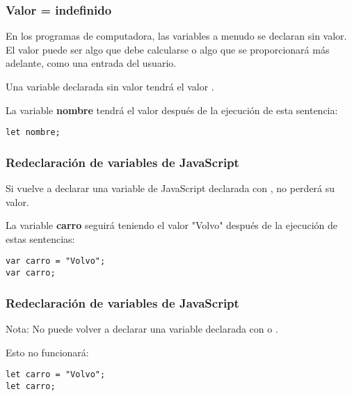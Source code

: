 \begin{frame}[fragile]
  \frametitle{Valor = indefinido}

  En los programas de computadora, las variables a menudo se declaran
  sin valor. El valor puede ser algo que debe calcularse o algo que
  se proporcionará más adelante, como una entrada del usuario.

  \vspace{\baselineskip}
  Una variable declarada sin valor tendrá el valor .

  \vspace{\baselineskip}
  La variable \textbf{nombre} tendrá el valor  después de la
  ejecución de esta sentencia:

  \vspace{\baselineskip}
  \begin{lstlisting}
let nombre;
  \end{lstlisting}
\end{frame}

\begin{frame}[fragile]
  \frametitle{Redeclaración de variables de JavaScript}

  Si vuelve a declarar una variable de JavaScript declarada
  con , no perderá su valor.

  \vspace{\baselineskip}
  La variable \textbf{carro} seguirá teniendo el valor
  "Volvo" después de la ejecución de estas sentencias:

  \vspace{\baselineskip}
  \begin{lstlisting}
var carro = "Volvo";
var carro;
  \end{lstlisting}
\end{frame}

\begin{frame}[fragile]
  \frametitle{Redeclaración de variables de JavaScript}

  \begin{alertblock}{Nota:}
    No puede volver a declarar una variable declarada con
     o .

    \vspace{\baselineskip}
    Esto no funcionará:
    \begin{lstlisting}
let carro = "Volvo";
let carro;
    \end{lstlisting}
  \end{alertblock}
\end{frame}

